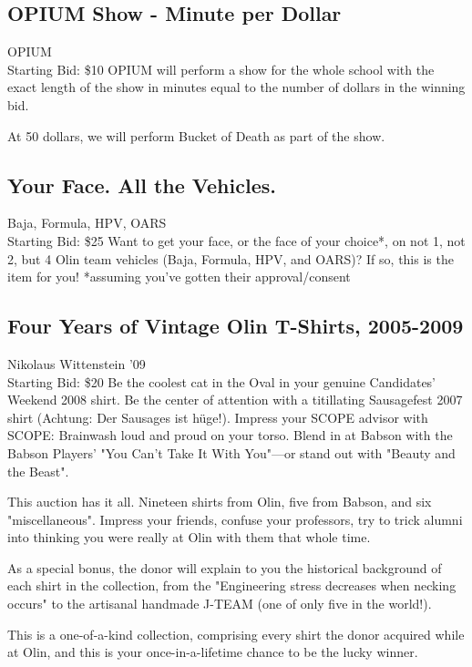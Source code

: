 \documentclass[11pt]{article}
\begin{document}
\subsection{OPIUM Show - Minute per Dollar}
OPIUM
\\
Starting Bid: \$10
\newline
OPIUM will perform a show for the whole school with the exact length of the show in minutes equal to the number of dollars in the winning bid.

At 50 dollars, we will perform Bucket of Death as part of the show.
\subsection{Your Face. All the Vehicles.}
Baja, Formula, HPV, OARS
\\
Starting Bid: \$25
\newline
Want to get your face, or the face of your choice*, on not 1, not 2, but 4 Olin team vehicles (Baja, Formula, HPV, and OARS)? If so, this is the item for you! *assuming you've gotten their approval/consent
\subsection{Four Years of Vintage Olin T-Shirts, 2005-2009}
Nikolaus Wittenstein '09
\\
Starting Bid: \$20
\newline
Be the coolest cat in the Oval in your genuine Candidates' Weekend 2008 shirt. 
Be the center of attention with a titillating Sausagefest 2007 shirt (Achtung: Der Sausages ist hüge!).
Impress your SCOPE advisor with SCOPE: Brainwash loud and proud on your torso.
Blend in at Babson with the Babson Players' "You Can't Take It With You"—or stand out with "Beauty and the Beast".

This auction has it all. Nineteen shirts from Olin, five from Babson, and six "miscellaneous". Impress your friends, confuse your professors, try to trick alumni into thinking you were really at Olin with them that whole time.

As a special bonus, the donor will explain to you the historical background of each shirt in the collection, from the "Engineering stress decreases when necking occurs" to the artisanal handmade J-TEAM (one of only five in the world!).

This is a one-of-a-kind collection, comprising every shirt the donor acquired while at Olin, and this is your once-in-a-lifetime chance to be the lucky winner.
\end{document}
